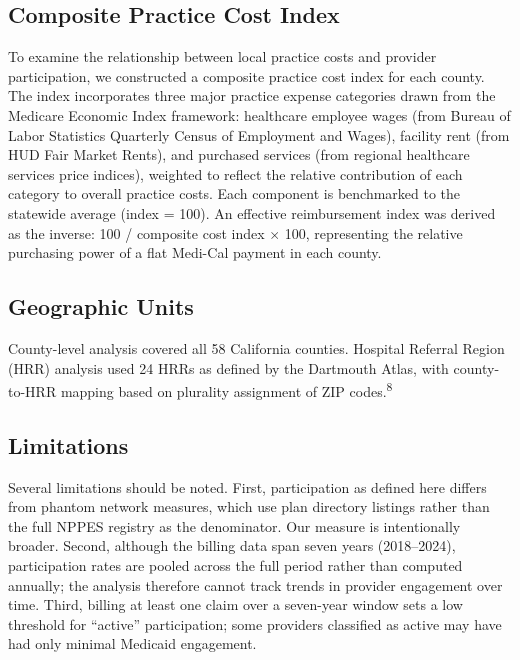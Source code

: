 \documentclass[12pt]{article}
\begin{document}
\subsection{Composite Practice Cost Index}

To examine the relationship between local practice costs and provider participation, we constructed a composite practice cost index for each county. The index incorporates three major practice expense categories drawn from the Medicare Economic Index framework: healthcare employee wages (from Bureau of Labor Statistics Quarterly Census of Employment and Wages), facility rent (from HUD Fair Market Rents), and purchased services (from regional healthcare services price indices), weighted to reflect the relative contribution of each category to overall practice costs. Each component is benchmarked to the statewide average (index = 100). An effective reimbursement index was derived as the inverse: 100 / composite cost index $\times$ 100, representing the relative purchasing power of a flat Medi-Cal payment in each county.

\subsection{Geographic Units}

County-level analysis covered all 58 California counties. Hospital Referral Region (HRR) analysis used 24 HRRs as defined by the Dartmouth Atlas, with county-to-HRR mapping based on plurality assignment of ZIP codes.\textsuperscript{8}

\subsection{Limitations}

Several limitations should be noted. First, participation as defined here differs from phantom network measures, which use plan directory listings rather than the full NPPES registry as the denominator. Our measure is intentionally broader. Second, although the billing data span seven years (2018--2024), participation rates are pooled across the full period rather than computed annually; the analysis therefore cannot track trends in provider engagement over time. Third, billing at least one claim over a seven-year window sets a low threshold for ``active'' participation; some providers classified as active may have had only minimal Medicaid engagement.

\end{document}
